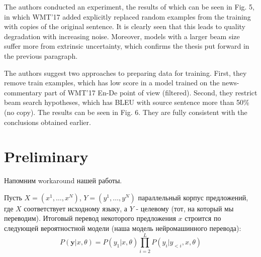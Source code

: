 \documentclass[a4paper,14pt]{extarticle}
\begin{document}
	\begin{figure}[t]
	\end{figure}
	
	The authors conducted an experiment, the results of which can be seen in Fig. 5, in which WMT'17 added explicitly replaced random examples from the training with copies of the original sentence. It is clearly seen that this leads to quality degradation with increasing noise. Moreover, models with a larger beam size suffer more from extrinsic uncertainty, which confirms the thesis put forward in the previous paragraph.
	
	The authors suggest two approaches to preparing data for training. First, they remove train examples, which has low score in a model trained on the news-commentary part of WMT'17 En-De point of view (filtered). Second, they restrict beam search hypotheses, which has BLEU with source sentence more than 50\% (no copy). The results can be seen in Fig. 6. They are fully consistent with the conclusions obtained earlier.

\section{Preliminary}
	Напомним workaround нашей работы.
	
	Пусть $X = (x^1, \dots, x^N)$, $Y = (y^1, \dots, y^N)$ параллельный корпус предложений, где $X$ соответствует исходному языку, а $Y$ - целевому (тот, на который мы переводим). Итоговый перевод некоторого предложения $x$ строится по следующей вероятностной модели (наша модель нейромашинного перевода): 
	\begin{equation*}
		P(\textbf{y} | x, \theta) = P(y_1 | x, \theta) \prod_{i=2}^{L} P(y_i | y_{<i}, x, \theta)
	\end{equation*}
	
\end{document}
